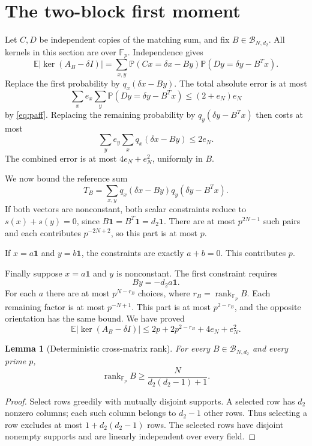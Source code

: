 \documentclass[11pt]{article}
\newtheorem{lemma}{Lemma}
\newcommand{\Fp}{\mathbb F_p}
\newcommand{\one}{\mathbf 1}
\newcommand{\E}{\mathbb E}
\newcommand{\Prob}{\mathbb P}
\newcommand{\rank}{\operatorname{rank}}
\begin{document}
\section{The two-block first moment}
Let $C,D$ be independent copies of the matching sum, and fix $B\in\mathcal B_{N,d_2}$. All kernels in this section are over $\Fp$. Independence gives
\begin{equation}\label{eq:kernelmoment}
 \E|\ker(A_B-\delta I)|
 =\sum_{x,y}\Prob(Cx=\delta x-By)\Prob(Dy=\delta y-B^Tx).
\end{equation}
Replace the first probability by $q_x(\delta x-By)$. The total absolute error is at most
\[
 \sum_x e_x\sum_y\Prob(Dy=\delta y-B^Tx)
 \le(2+e_N)e_N
\]
by \eqref{eq:paff}. Replacing the remaining probability by $q_y(\delta y-B^Tx)$ then costs at most
\[
 \sum_y e_y\sum_xq_x(\delta x-By)\le2e_N.
\]
The combined error is at most $4e_N+e_N^2$, uniformly in $B$.

We now bound the reference sum
\[
 T_B=\sum_{x,y}q_x(\delta x-By)q_y(\delta y-B^Tx).
\]
If both vectors are nonconstant, both scalar constraints reduce to $s(x)+s(y)=0$, since $B\one=B^T\one=d_2\one$. There are at most $p^{2N-1}$ such pairs and each contributes $p^{-2N+2}$, so this part is at most $p$.

If $x=a\one$ and $y=b\one$, the constraints are exactly $a+b=0$. This contributes $p$.

Finally suppose $x=a\one$ and $y$ is nonconstant. The first constraint requires
\[
 By=-d_2a\one.
\]
For each $a$ there are at most $p^{N-r_B}$ choices, where $r_B=\rank_{\Fp}B$. Each remaining factor is at most $p^{-N+1}$. This part is at most $p^{2-r_B}$, and the opposite orientation has the same bound. We have proved
\begin{equation}\label{eq:momentbound}
 \E|\ker(A_B-\delta I)|
 \le2p+2p^{2-r_B}+4e_N+e_N^2.
\end{equation}

\begin{lemma}[Deterministic cross-matrix rank]
For every $B\in\mathcal B_{N,d_2}$ and every prime $p$,
\[
 \rank_{\Fp}B\ge \frac{N}{d_2(d_2-1)+1}.
\]
\end{lemma}
\begin{proof}
Select rows greedily with mutually disjoint supports. A selected row has $d_2$ nonzero columns; each such column belongs to $d_2-1$ other rows. Thus selecting a row excludes at most $1+d_2(d_2-1)$ rows. The selected rows have disjoint nonempty supports and are linearly independent over every field.
\end{proof}
\end{document}
